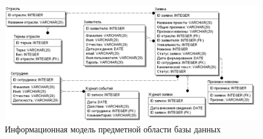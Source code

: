 \begin{figure}[H]
  \begin{center}
    \includegraphics[width=1\textwidth]{authors/kopchenko-fig-2.png}
  \end{center}
  \caption {Информационная модель предметной области базы данных}

\end{figure}
